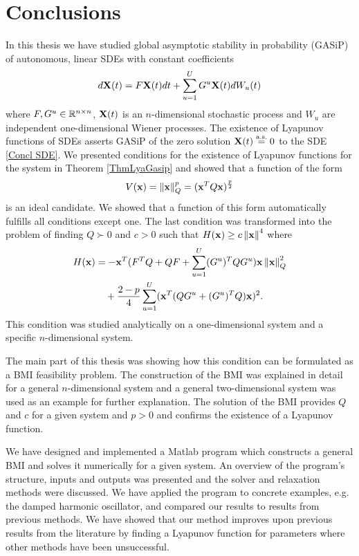 \documentclass[a4paper,12pt,twoside,BCOR=10mm]{scrbook}
\begin{document}
\chapter{Conclusions}
In this thesis we have studied global asymptotic stability in probability (GASiP) of autonomous, linear SDEs with constant coefficients
\begin{align}\label{Concl SDE}
    d\mathbf{X}(t) = F\mathbf{X}(t)dt + \sum\limits_{u = 1}^UG^u \mathbf{X}(t)dW_u(t)
\end{align}
where $F,G^u \in \mathbb{R}^{n\times n}$, $\mathbf{X}(t)$ is an $n$-dimensional stochastic process and $W_u$ are independent one-dimensional Wiener processes. The existence of Lyapunov functions of SDEs asserts GASiP of the zero solution $\mathbf{X}(t) \stackrel{\text{a.s.}}{=} 0$ to the SDE \eqref{Concl SDE}. We presented conditions for the existence of Lyapunov functions for the system in Theorem \ref{ThmLyaGasip} and showed that a function of the form
\begin{align*}
    V(\mathbf{x}) = \left\lVert\mathbf{x}\right\rVert_Q^p = (\mathbf{x}^T Q \mathbf{x})^\frac{p}{2}
\end{align*}
is an ideal candidate. We showed that a function of this form automatically fulfills all conditions except one. The last condition was transformed into the problem of finding $Q \succ 0$ and $c > 0$ such that $H(\mathbf{x}) \geq c\left\lVert\mathbf{x}\right\rVert_{}^{4}$ where
\begin{align*}
    H(\mathbf{x}) &= -\mathbf{x}^T (F^T Q + QF + \sum_{u = 1}^U (G^u)^TQG^u) \mathbf{x}\left\lVert\mathbf{x}\right\rVert_{Q}^{2}\\
    &\quad+ \frac{2 - p}{4} \sum_{u = 1}^U (\mathbf{x}^T (QG^u + (G^u)^TQ)\mathbf{x})^2.
\end{align*}
This condition was studied analytically on a one-dimensional system and a specific $n$-dimensional system.

The main part of this thesis was showing how this condition can be formulated as a BMI feasibility problem. The construction of the BMI was explained in detail for a general $n$-dimensional system and a general two-dimensional system was used as an example for further explanation. The solution of the BMI provides $Q$ and $c$ for a given system and $p > 0$ and confirms the existence of a Lyapunov function.

We have designed and implemented a Matlab program which constructs a general BMI and solves it numerically for a given system. An overview of the program's structure, inputs and outputs was presented and the solver and relaxation methods were discussed. We have applied the program to concrete examples, e.g. the damped harmonic oscillator, and compared our results to results from previous methods. We have showed that our method improves upon previous results from the literature by finding a Lyapunov function for parameters where other methods have been unsuccessful.


\end{document}
